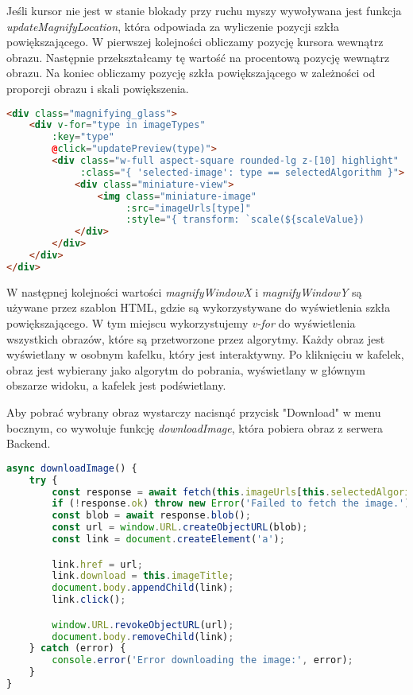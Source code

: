 Jeśli kursor nie jest w stanie blokady przy ruchu myszy wywoływana jest funkcja \textit{updateMagnifyLocation}, która odpowiada za wyliczenie pozycji szkła powiększającego. W pierwszej kolejności obliczamy pozycję kursora wewnątrz obrazu. Następnie przekształcamy tę wartość na procentową pozycję wewnątrz obrazu. Na koniec obliczamy pozycję szkła powiększającego w zależności od proporcji obrazu i skali powiększenia.

\begin{lstlisting}[language=HTML, caption=Implementacja szkła powiększającego (HTML)., label={lst:zoom}]
<div class="magnifying_glass">
    <div v-for="type in imageTypes" 
        :key="type" 
        @click="updatePreview(type)">
        <div class="w-full aspect-square rounded-lg z-[10] highlight" 
             :class="{ 'selected-image': type == selectedAlgorithm }">
            <div class="miniature-view">
                <img class="miniature-image" 
                     :src="imageUrls[type]" 
                     :style="{ transform: `scale(${scaleValue})              translate(${-magnifyWindowX * 100}%, ${-magnifyWindowY * 100}%)`}">
            </div>    
        </div>
    </div>
</div>
\end{lstlisting}

W następnej kolejności wartości \textit{magnifyWindowX} i \textit{magnifyWindowY} są używane przez szablon HTML, gdzie są wykorzystywane do wyświetlenia szkła powiększającego. W tym miejscu wykorzystujemy \textit{v-for} do wyświetlenia wszystkich obrazów, które są przetworzone przez algorytmy. Każdy obraz jest wyświetlany w osobnym kafelku, który jest interaktywny. Po kliknięciu w kafelek, obraz jest wybierany jako algorytm do pobrania, wyświetlany w głównym obszarze widoku, a kafelek jest podświetlany.

Aby pobrać wybrany obraz wystarczy nacisnąć przycisk "Download" w menu bocznym, co wywołuje funkcję \textit{downloadImage}, która pobiera obraz z serwera Backend.

\begin{lstlisting}[language=TypeScript, caption=Pobieranie obrazu., label={lst:download}]
async downloadImage() {
    try {
        const response = await fetch(this.imageUrls[this.selectedAlgorithm]);
        if (!response.ok) throw new Error('Failed to fetch the image.');
        const blob = await response.blob();
        const url = window.URL.createObjectURL(blob);
        const link = document.createElement('a');

        link.href = url;
        link.download = this.imageTitle;
        document.body.appendChild(link);
        link.click();

        window.URL.revokeObjectURL(url);
        document.body.removeChild(link);
    } catch (error) {
        console.error('Error downloading the image:', error);
    }
}
\end{lstlisting}

